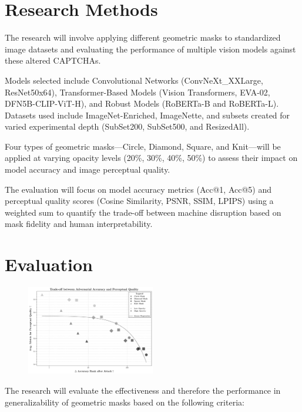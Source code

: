 \documentclass[a4paper,11pt]{article}
\begin{document}
\section*{Research Methods}

The research will involve applying different geometric masks to standardized image datasets and evaluating the performance of multiple vision models against these altered CAPTCHAs.

Models selected include Convolutional Networks (ConvNeXt\_XXLarge, ResNet50x64), Transformer-Based Models (Vision Transformers, EVA-02, DFN5B-CLIP-ViT-H), and Robust Models (RoBERTa-B and RoBERTa-L). Datasets used include ImageNet-Enriched, ImageNette, and subsets created for varied experimental depth (SubSet200, SubSet500, and ResizedAll).

Four types of geometric masks—Circle, Diamond, Square, and Knit—will be applied at varying opacity levels (20\%, 30\%, 40\%, 50\%) to assess their impact on model accuracy and image perceptual quality.

The evaluation will focus on model accuracy metrics (Acc@1, Acc@5) and perceptual quality scores (Cosine Similarity, PSNR, SSIM, LPIPS) using a weighted sum to quantify the trade-off between machine disruption based on mask fidelity and human interpretability.

\section*{Evaluation}

\begin{figure}
    \vspace{-1.5em}
    \includegraphics[width=0.5\textwidth]{figures/eval_cls_Generalizability}
    \vspace{-5em}
\end{figure}

The research will evaluate the effectiveness and therefore the performance in generalizability of geometric masks based on the following criteria:
\end{document}
